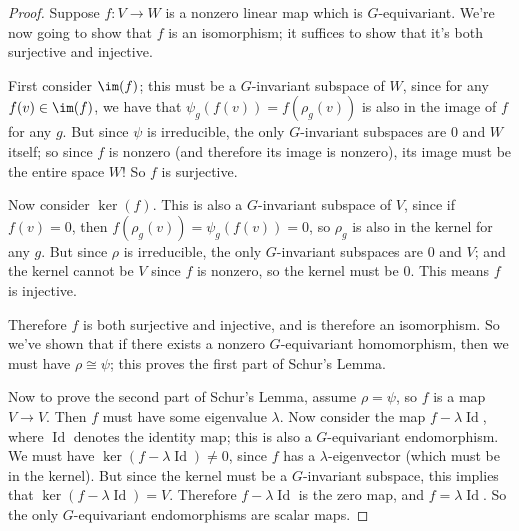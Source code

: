 \begin{proof}
Suppose $f : V \to W$ is a nonzero linear map which is $G$-equivariant. We're now going to show that $f$ is an isomorphism; it suffices to show that it's both surjective and injective. 

First consider $\im(f)$; this must be a $G$-invariant subspace of $W$, since for any $f(v) \in \im(f)$, we have that $\psi_g(f(v)) = f(\rho_g(v))$ is also in the image of $f$ for any $g$. But since $\psi$ is irreducible, the only $G$-invariant subspaces are $0$ and $W$ itself; so since $f$ is nonzero (and therefore its image is nonzero), its image must be the entire space $W$! So $f$ is surjective. 

Now consider $\ker(f)$. This is also a $G$-invariant subspace of $V$, since if $f(v) = 0$, then $f(\rho_g(v)) = \psi_g(f(v)) = 0$, so $\rho_g$ is also in the kernel for any $g$. But since $\rho$ is irreducible, the only $G$-invariant subspaces are $0$ and $V$; and the kernel cannot be $V$ since $f$ is nonzero, so the kernel must be $0$. This means $f$ is injective. 

Therefore $f$ is both surjective and injective, and is therefore an isomorphism. So we've shown that if there exists a nonzero $G$-equivariant homomorphism, then we must have $\rho \cong \psi$; this proves the first part of Schur's Lemma. 

Now to prove the second part of Schur's Lemma, assume $\rho = \psi$, so $f$ is a map $V \to V$. Then $f$ must have some eigenvalue $\lambda$. Now consider the map $f - \lambda \operatorname{Id}$, where $\operatorname{Id}$ denotes the identity map; this is also a $G$-equivariant endomorphism. We must have $\ker(f - \lambda \operatorname{Id}) \neq 0$, since $f$ has a $\lambda$-eigenvector (which must be in the kernel). But since the kernel must be a $G$-invariant subspace, this implies that $\ker(f - \lambda \operatorname{Id}) = V$. Therefore $f - \lambda \operatorname{Id}$ is the zero map, and $f = \lambda \operatorname{Id}$. So the only $G$-equivariant endomorphisms are scalar maps. 
\end{proof}


